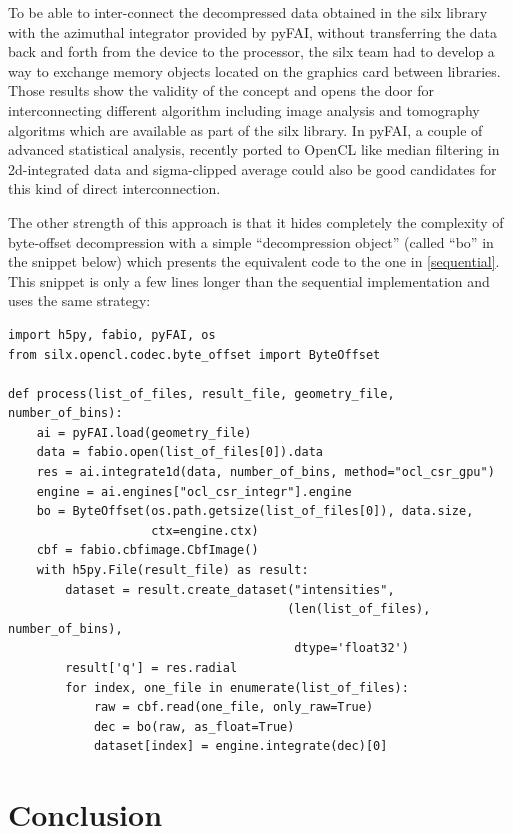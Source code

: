 \documentclass[preprint]{iucr}              %
\begin{document}
To be able to inter-connect the decompressed data obtained in the silx library
with the azimuthal integrator provided by pyFAI, without transferring the data
back and forth from the device to the processor, the silx team had to develop a
way to exchange memory objects located on the graphics card between libraries. 
Those results show the validity of the concept and opens the door for
interconnecting different algorithm including image analysis and
tomography algoritms which are available as part of the silx library.
In pyFAI, a couple of advanced statistical analysis, recently ported to
OpenCL like median filtering in 2d-integrated data and sigma-clipped
average could also be good candidates for this kind of direct interconnection.

The other strength of this approach is that it hides completely the
complexity of byte-offset decompression with a simple ``decompression
object'' (called ``bo'' in the snippet below) which presents the equivalent
code to the one in \ref{sequential}.
This snippet is only a few lines longer than the sequential implementation and
uses the same strategy:

\begin{minipage}{\linewidth}
\begin{verbatim}
import h5py, fabio, pyFAI, os
from silx.opencl.codec.byte_offset import ByteOffset

def process(list_of_files, result_file, geometry_file, number_of_bins):
    ai = pyFAI.load(geometry_file)
    data = fabio.open(list_of_files[0]).data
    res = ai.integrate1d(data, number_of_bins, method="ocl_csr_gpu")
    engine = ai.engines["ocl_csr_integr"].engine
    bo = ByteOffset(os.path.getsize(list_of_files[0]), data.size,
                    ctx=engine.ctx) 
    cbf = fabio.cbfimage.CbfImage()
    with h5py.File(result_file) as result:
        dataset = result.create_dataset("intensities", 
                                       (len(list_of_files), number_of_bins),
                                        dtype='float32') 
        result['q'] = res.radial 
        for index, one_file in enumerate(list_of_files):
            raw = cbf.read(one_file, only_raw=True)
            dec = bo(raw, as_float=True)
            dataset[index] = engine.integrate(dec)[0]
\end{verbatim}
\end{minipage}

\section{Conclusion}
\end{document}
